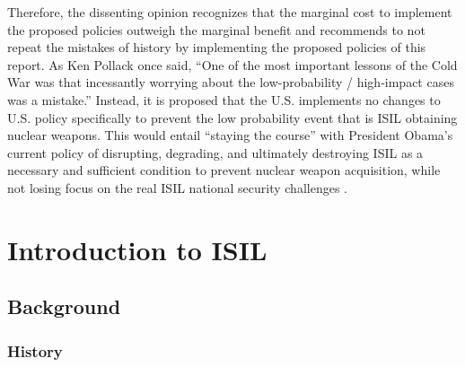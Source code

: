 \documentclass{report}
\begin{document}
Therefore, the dissenting opinion recognizes that the marginal cost to implement the proposed policies outweigh the marginal benefit and recommends to not repeat the mistakes of history by implementing the proposed policies of this report. As Ken Pollack once said, \enquote{One of the most important lessons of the Cold War was that incessantly worrying about the low-probability / high-impact cases was a mistake.}  
Instead, it is proposed that the U.S. implements no changes to U.S. policy specifically to prevent the low probability event that is ISIL obtaining nuclear weapons. This would entail \enquote{staying the course} with President Obama's current policy of disrupting, degrading, and ultimately destroying ISIL as a necessary and sufficient condition to prevent nuclear weapon acquisition, while not losing focus on the real ISIL national security challenges \cite{WhiteHouse2014}.











\chapter{Introduction to ISIL}





   
   

    
    
    
    \section{Background}
    
    \subsection{History}
    
\end{document}
